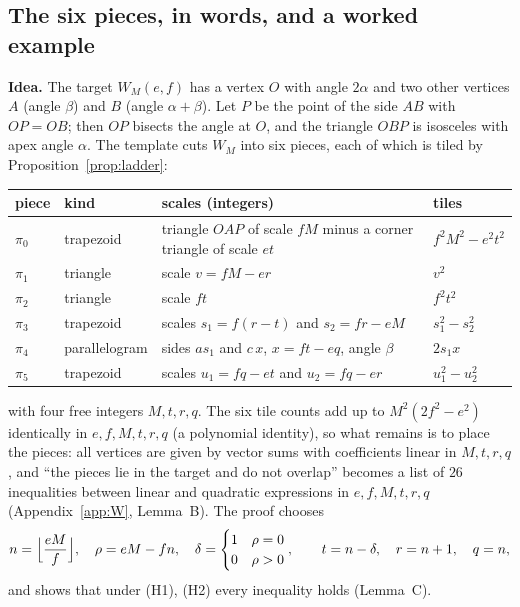 \documentclass[11pt,reqno]{amsart}
\theoremstyle{plain}
\theoremstyle{definition}
\begin{document}
\subsection{The six pieces, in words, and a worked example}\label{sub:six}
\textbf{Idea.} The target $W_M(e,f)$ has a vertex $O$ with angle $2\alpha$ and two other vertices $A$ (angle $\beta$) and $B$ (angle $\alpha+\beta$).
Let $P$ be the point of the side $AB$ with $OP=OB$; then $OP$ bisects the angle at $O$, and the triangle $OBP$ is isosceles with apex angle $\alpha$.
The template cuts $W_M$ into six pieces, each of which is tiled by Proposition~\ref{prop:ladder}:
\begin{center}\small
\begin{tabular}{@{}llp{6.6cm}l@{}}
\toprule
piece & kind & scales (integers) & tiles\\
\midrule
$\pi_0$ & trapezoid & triangle $OAP$ of scale $fM$ minus a corner triangle of scale $et$ & $f^2M^2-e^2t^2$\\
$\pi_1$ & triangle & scale $v=fM-er$ & $v^2$\\
$\pi_2$ & triangle & scale $ft$ & $f^2t^2$\\
$\pi_3$ & trapezoid & scales $s_1=f(r-t)$ and $s_2=fr-eM$ & $s_1^2-s_2^2$\\
$\pi_4$ & parallelogram & sides $a s_1$ and $c\,x$, $x=ft-eq$, angle $\beta$ & $2s_1x$\\
$\pi_5$ & trapezoid & scales $u_1=fq-et$ and $u_2=fq-er$ & $u_1^2-u_2^2$\\
\bottomrule
\end{tabular}
\end{center}
with four free integers $M,t,r,q$.
The six tile counts add up to $M^2(2f^2-e^2)$ identically in $e,f,M,t,r,q$ (a polynomial identity), so what remains is to place the pieces: all vertices are given by vector sums with coefficients linear in $M,t,r,q$, and ``the pieces lie in the target and do not overlap'' becomes a list of $26$ inequalities between linear and quadratic expressions in $e,f,M,t,r,q$ (Appendix~\ref{app:W}, Lemma~B).
The proof chooses
\[
n=\Bigl\lfloor \frac{eM}{f}\Bigr\rfloor,\quad \rho=eM-fn,\quad \delta=\begin{cases}1&\rho=0\\0&\rho>0\end{cases},\qquad t=n-\delta,\quad r=n+1,\quad q=n ,
\]
and shows that under (H1), (H2) every inequality holds (Lemma~C).
\end{document}
